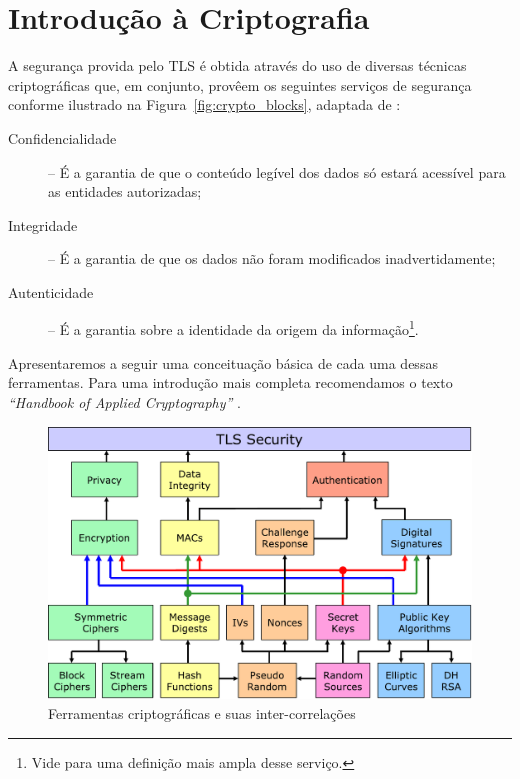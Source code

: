 
\chapter{Introdução à Criptografia}

A segurança provida pelo TLS é obtida através do uso de diversas 
técnicas criptográficas que, em conjunto, provêem os seguintes serviços de segurança 
conforme ilustrado na Figura~\vref{fig:crypto_blocks}, adaptada de \cite{Steffen}:

\begin{description}
	\item[Confidencialidade] -- É a garantia de que o conteúdo legível dos dados
	só estará acessível para as entidades autorizadas;
	\item[Integridade] -- É a garantia de que os dados não foram modificados inadvertidamente;
	\item[Autenticidade] -- É a garantia sobre a identidade da origem da informação\footnote{Vide
							\cite[seção~1.1]{hac} para uma definição mais ampla desse serviço.}.
\end{description}

Apresentaremos a seguir uma conceituação básica de cada uma dessas ferramentas.
Para uma introdução mais completa recomendamos o texto \emph{``Handbook of Applied Cryptography''} \cite{hac}.

\begin{figure}[htbp]
    \centering
		\includegraphics[width=\textwidth]{fig/crypto_blocks}
    \caption{Ferramentas criptográficas e suas inter-correlações}
    \label{fig:crypto_blocks}
\end{figure}

